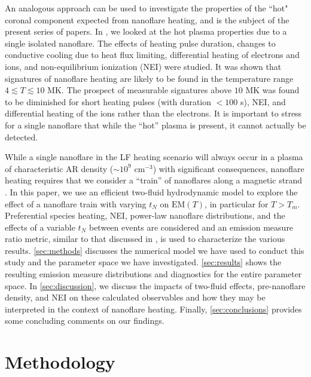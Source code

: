 \documentclass[preprint,linenumbers]{aastex}
\begin{document}
	\par An analogous approach can be used to investigate the properties of the ``hot" coronal component expected from nanoflare heating, and is the subject of the present series of papers. In \citet{barnes_inference_2016} , we looked at the hot plasma properties due to a single isolated nanoflare. The effects of heating pulse duration, changes to conductive cooling due to heat flux limiting, differential heating of electrons and ions, and non-equilibrium ionization (NEI) were studied. It was shown that signatures of nanoflare heating are likely to be found in the temperature range $4\lesssim T\lesssim 10$ MK. The prospect of measurable signatures above $10$ MK was found to be diminished for short heating pulses (with duration $<100$ s), NEI, and differential heating of the ions rather than the electrons. It is important to stress for a single nanoflare that while the ``hot'' plasma is present, it cannot actually be detected.
	\par While a single nanoflare in the LF heating scenario will always occur in a plasma of characteristic AR density ($\sim10^9$ cm$^{-3}$) with significant consequences, nanoflare heating requires that we consider a ``train'' of nanoflares along a magnetic strand \citep{viall_patterns_2011,warren_constraints_2011,reep_diagnosing_2013,cargill_modelling_2015}. In this paper, we use an efficient two-fluid hydrodynamic model to explore the effect of a nanoflare train with varying $t_N$ on $\mathrm{EM}(T)$, in particular for $T>T_m$. Preferential species heating, NEI, power-law nanoflare distributions, and the effects of a variable $t_N$ between events are considered and an emission measure ratio metric, similar to that discussed in \citet{brosius_pervasive_2014}, is used to characterize the various results. \autoref{sec:methods} discusses the numerical model we have used to conduct this study and the parameter space we have investigated. \autoref{sec:results} shows the resulting emission measure distributions and diagnostics for the entire parameter space. In \autoref{sec:discussion}, we discuss the impacts of two-fluid effects, pre-nanoflare density, and NEI on these calculated observables and how they may be interpreted in the context of nanoflare heating. Finally, \autoref{sec:conclusions} provides some concluding comments on our findings.
	\section{Methodology}
	\label{sec:methods}
\end{document}
